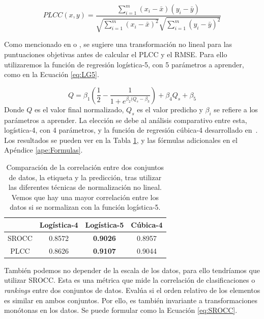 \begin{equation}
  PLCC(x,y) = \frac{\sum_{i=1}^m (x_i - \bar x)(y_i - \bar y)}{\sqrt{\sum_{i=1}^m (x_i - \bar x)^2}\sqrt{\sum_{i=1}^m (y_i - \bar y)^2}}
\label{eq:PLCC}
\end{equation}

Como mencionado en \cite{ResSCNN} o \cite{VQA-PC}, se sugiere una transformación 
no lineal para las puntuaciones objetivas antes de calcular el PLCC y el RMSE.
Para ello utilizaremos la función de regresión logística-5, con 5 parámetros a aprender,
como en la Ecuación \eqref{eq:LG5}. 

\begin{equation}
  Q = \beta_1 \left(\frac{1}{2} - \frac{1}{1+e^{\beta_2 (Q_s-\beta_3}} \right) + \beta_4 Q_s + \beta_5
  \label{eq:LG5}
\end{equation}
Donde $Q$ es el valor final normalizado, $Q_s$ es el valor predicho y $\beta_i$ se 
refiere a los parámetros a aprender.
La elección se debe al análisis comparativo entre esta, logística-4, con 4 parámetros, y la función de regresión cúbica-4
desarrollado en~\cite{ResSCNN}. Los resultados se pueden ver en la Tabla \ref{tab:CompareNonLineal}, 
y las fórmulas adicionales en el Apéndice \ref{ape:Formulas}.

\begin{table}[htp]
  \centering
  \scriptsize
  \begin{tabular}{|c|c|c|c|}
    \hline
    \rowcolor[HTML]{FFC702} 
    & \textbf{Logística-4} & \textbf{Logística-5} & \textbf{Cúbica-4} \\
    \hline 
    SROCC & 0.8572 & \textbf{0.9026} & 0.8957\\
    \hline
    PLCC & 0.8626 & \textbf{0.9107} & 0.9044 \\
    \hline 
  \end{tabular}
\caption[Comparativa entre funciones de normalización.]{Comparación de la correlación entre dos conjuntos de datos, la etiqueta y 
  la predicción, tras utilizar las diferentes técnicas de normalización no lineal. 
Vemos que hay una mayor correlación entre los datos si se normalizan con la 
función logística-5.}
  \label{tab:CompareNonLineal}
\end{table}
También podemos no depender de la escala de los datos, para ello tendríamos que 
utilizar SROCC.
Esta es una métrica que mide la correlación de clasificaciones o \emph{rankings} entre 
dos conjuntos de datos. Evalúa si el orden relativo de los elementos es similar 
en ambos conjuntos. Por ello, es también invariante a transformaciones monótonas 
en los datos. Se puede formular como la Ecuación \ref{eq:SROCC}.

